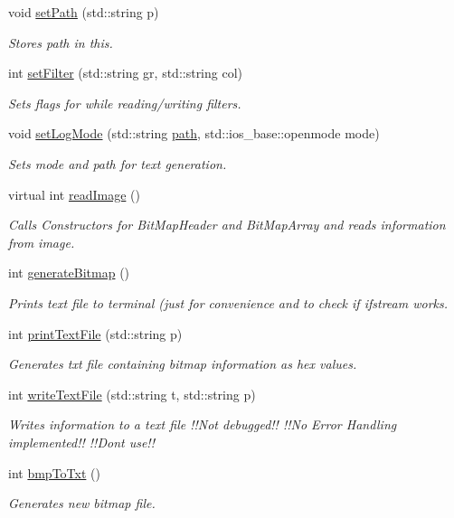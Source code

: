 \begin{DoxyCompactItemize}
void \mbox{\hyperlink{classImage_aabb8cec47c25c0e3a36ba2a455c2aa6c}{set\+Path}} (std\+::string p)
\begin{DoxyCompactList}\small\item\em Stores path in this. \end{DoxyCompactList}\item 
int \mbox{\hyperlink{classImage_ac81078a3d6c364aada9afc3c8a668ef8}{set\+Filter}} (std\+::string gr, std\+::string col)
\begin{DoxyCompactList}\small\item\em Sets flags for while reading/writing filters. \end{DoxyCompactList}\item 
void \mbox{\hyperlink{classImage_a0197f1cb3ea1518404ae3a53764bd5df}{set\+Log\+Mode}} (std\+::string \mbox{\hyperlink{classImage_aec8a33f176362d146da8c058798ebbff}{path}}, std\+::ios\+\_\+base\+::openmode mode)
\begin{DoxyCompactList}\small\item\em Sets mode and path for text generation. \end{DoxyCompactList}\item 
virtual int \mbox{\hyperlink{classImage_ac0aa1f41cb368d87b20dd38839218d93}{read\+Image}} ()
\begin{DoxyCompactList}\small\item\em Calls Constructors for Bit\+Map\+Header and Bit\+Map\+Array and reads information from image. \end{DoxyCompactList}\item 
int \mbox{\hyperlink{classImage_a3ca1ae6c1eb2846bfba066b01e6020e1}{generate\+Bitmap}} ()
\begin{DoxyCompactList}\small\item\em Prints text file to terminal (just for convenience and to check if ifstream works. \end{DoxyCompactList}\item 
int \mbox{\hyperlink{classImage_ae5daf791502caefeae1b15360d354513}{print\+Text\+File}} (std\+::string p)
\begin{DoxyCompactList}\small\item\em Generates txt file containing bitmap information as hex values. \end{DoxyCompactList}\item 
int \mbox{\hyperlink{classImage_a2dc30c9d6280b8c0edd2f4f0ab474a5c}{write\+Text\+File}} (std\+::string t, std\+::string p)
\begin{DoxyCompactList}\small\item\em Writes information to a text file !!\+Not debugged!! !!\+No Error Handling implemented!! !!\+Dont use!! \end{DoxyCompactList}\item 
int \mbox{\hyperlink{classImage_aa16c9acd068079c676dec4186262b1b7}{bmp\+To\+Txt}} ()
\begin{DoxyCompactList}\small\item\em Generates new bitmap file. \end{DoxyCompactList}\end{DoxyCompactItemize}
